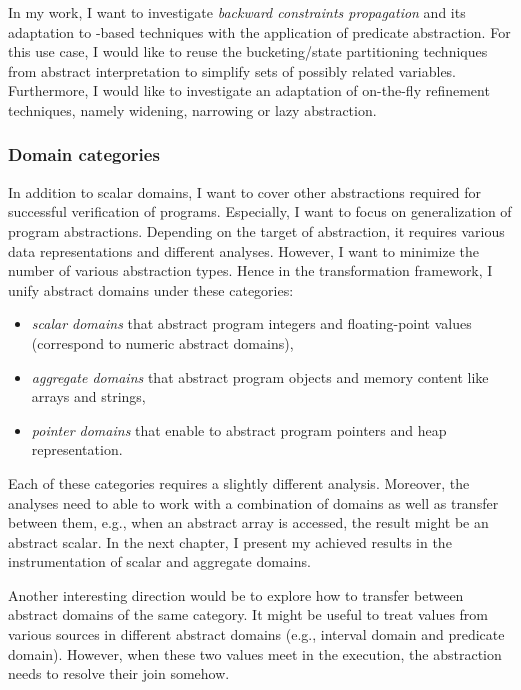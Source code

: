 In my work, I want to investigate \emph{backward constraints propagation} and
its adaptation to \cegar-based techniques with the application of predicate
abstraction. For this use case, I would like to reuse the bucketing/state
partitioning techniques from abstract interpretation to simplify sets of
possibly related variables. Furthermore, I would like to investigate an
adaptation of on-the-fly refinement techniques, namely widening, narrowing or
lazy abstraction.

\subsubsection{Domain categories}

In addition to scalar domains, I want to cover other abstractions required for
successful verification of \llvm programs. Especially, I want to focus on
generalization of program abstractions. Depending on the target of abstraction,
it requires various data representations and different analyses. However, I
want to minimize the number of various abstraction types. Hence in the
transformation framework, I unify abstract domains under these categories:

\begin{itemize}
    \item \emph{scalar domains} that abstract program integers and floating-point values (correspond to numeric abstract domains),
    \item \emph{aggregate domains} that abstract program objects and memory content like arrays and strings,

    \item \emph{pointer domains} that enable to abstract program pointers and heap representation.
\end{itemize}

\noindent
Each of these categories requires a slightly different analysis. Moreover,  the
analyses need to able to work with a combination of domains as well as transfer
between them, e.g., when an abstract array is accessed, the result might
be an abstract scalar.  In the next chapter, I present my achieved results in
the instrumentation of scalar and aggregate domains.

Another interesting direction would be to explore how to transfer between
abstract domains of the same category. It might be useful to treat values from
various sources in different abstract domains (e.g., interval domain and
predicate domain). However, when these two values meet in the execution, the
abstraction needs to resolve their join somehow.

